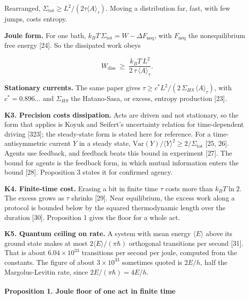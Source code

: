 \documentclass[
  10pt,
]{article}
\newcounter{none} %
\begin{document}
Rearranged,
\(\Sigma_{\mathrm{tot}} \ge L^2/(2\tau\langle A\rangle_\tau)\). Moving a
distribution far, fast, with few jumps, costs entropy.

\textbf{Joule form.} For one bath,
\(k_B T\,\Sigma_{\mathrm{tot}} = W - \Delta F_{\mathrm{neq}}\), with
\(F_{\mathrm{neq}}\) the nonequilibrium free energy {[}24{]}. So the
dissipated work obeys

\[W_{\mathrm{diss}} \;\ge\; \frac{k_B T\, L^2}{2\,\tau\,\langle A\rangle_\tau}.\]

\textbf{Stationary currents.} The same paper gives
\(\tau \ge c^* L^2 / (2\,\Sigma_{HS}\,\langle A\rangle_\tau)\), with
\(c^* = 0.896\ldots\) and \(\Sigma_{HS}\) the Hatano-Sasa, or excess,
entropy production {[}23{]}.

\textbf{K3. Precision costs dissipation.} Acts are driven and not
stationary, so the form that applies is Koyuk and Seifert's uncertainty
relation for time-dependent driving {[}323{]}; the steady-state form is
stated here for reference. For a time-antisymmetric current \(Y\) in a
steady state,
\(\mathrm{Var}(Y)/\langle Y\rangle^2 \ge 2/\Sigma_{\mathrm{tot}}\)
{[}25, 26{]}. Agents use feedback, and feedback beats this bound in
experiment {[}27{]}. The bound for agents is the feedback form, in which
mutual information enters the bound {[}28{]}. Proposition 3 states it
for confirmed agency.

\textbf{K4. Finite-time cost.} Erasing a bit in finite time \(\tau\)
costs more than \(k_B T \ln 2\). The excess grows as \(\tau\) shrinks
{[}29{]}. Near equilibrium, the excess work along a protocol is bounded
below by the squared thermodynamic length over the duration {[}30{]}.
Proposition 1 gives the floor for a whole act.

\textbf{K5. Quantum ceiling on rate.} A system with mean energy
\(\langle E\rangle\) above its ground state makes at most
\(2\langle E\rangle/(\pi\hbar)\) orthogonal transitions per second
{[}31{]}. That is about \(6.04 \times 10^{33}\) transitions per second
per joule, computed from the constants. The figure of about
\(3 \times 10^{33}\) sometimes quoted is \(2E/h\), half the
Margolus-Levitin rate, since \(2E/(\pi\hbar) = 4E/h\).

\paragraph{Proposition 1. Joule floor of one act in finite
time}\label{proposition-1.-joule-floor-of-one-act-in-finite-time}
\end{document}
